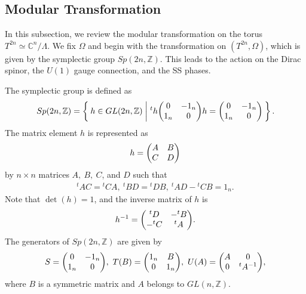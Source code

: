 \documentclass[11pt]{article}
\begin{document}

\subsection{Modular Transformation}
In this subsection, we review the modular transformation on the torus $T^{2n} \simeq\mathbb{C}^n / \Lambda$. We fix $\Omega$ and begin with the transformation on $(T^{2n},\Omega)$, which is given by the symplectic group $Sp(2n,\mathbb{Z})$. This leads to the action on the Dirac spinor, the $U(1)$ gauge connection, and the SS phases.



The symplectic group is defined as
\begin{align}
    Sp(2n,\mathbb{Z})= \Set{ h \in GL(2n , \mathbb{Z})|   {}^t h \mqty( 0  & -1_n \\ 1_n & 0) h=   \mqty( 0  & -1_n \\ 1_n & 0) }.
\end{align}
The matrix element $h$ is represented as
\begin{align}
    h= \mqty(A & B \\ C & D)
\end{align}
by $n \times n$ matrices $A,~B,~C$, and $D$ such that
\begin{align}
    {}^t A C= {}^t C A,~ {}^t B D= {}^t D B,~{}^t AD- {}^t C B=1_n. \label{eq:symplectic conditions}
\end{align}
Note that $\det(h)=1$, and the inverse matrix of $h$ is 
\begin{align}
    h^{-1}= \mqty({}^tD & -{}^t B \\- {}^tC & {}^t A).
\end{align}
The generators of $Sp(2n,\mathbb{Z})$ are given by
\begin{align}
    S= \mqty( 0  & -1_n \\ 1_n & 0),~T(B)= \mqty( 1_n  & B \\  0 & 1_n),~ U(A)=\mqty( A & 0 \\ 0 & {}^tA^{-1}),
\end{align}
where $B$ is a symmetric matrix and $A$ belongs to $GL(n, \mathbb{Z})$. 
\end{document}
